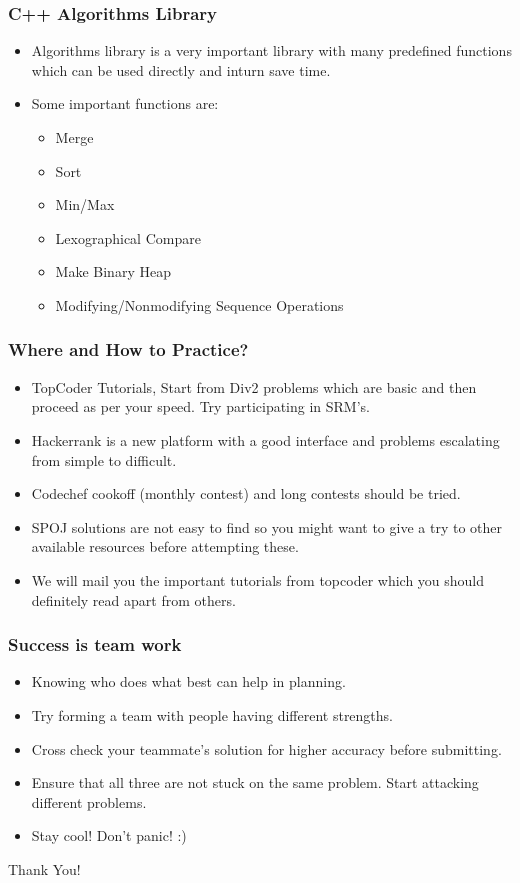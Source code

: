 \documentclass{beamer}
\begin{document}
\begin{frame}
\frametitle{C++ Algorithms Library}
\begin{itemize}
\item Algorithms library is a very important library with many predefined functions which can be used directly and inturn save time.
\item Some important functions are:
\begin{itemize}
\item Merge
\item Sort
\item Min/Max
\item Lexographical Compare
\item Make Binary Heap
\item Modifying/Nonmodifying Sequence Operations
\end{itemize}
\end{itemize}
\end{frame}





\begin{frame}
\frametitle{Where and How to Practice?}
\begin{itemize}
\item TopCoder Tutorials, Start from Div2 problems which are basic and then proceed as per your speed. Try participating in SRM's.
\item Hackerrank is a new platform with a good interface and problems escalating from simple to difficult.
\item Codechef cookoff (monthly contest) and long contests should be tried.
\item SPOJ solutions are not easy to find so you might want to give a try to other available resources before attempting these.
\item We will mail you the important tutorials from topcoder which you should definitely read apart from others.
\end{itemize}
\end{frame}

\begin{frame}
\frametitle{Success is team work}
\begin{itemize}
\item Knowing who does what best can help in planning.
\item Try forming a team with people having different strengths.
\item Cross check your teammate’s solution for higher accuracy before submitting.
\item Ensure that all three are not stuck on the same problem. Start attacking different problems.
\item Stay cool! Don’t panic! :)
\end{itemize}
\end{frame}



\begin{frame}
\Huge{\centerline{Thank You!}}
\end{frame}

\end{document}
